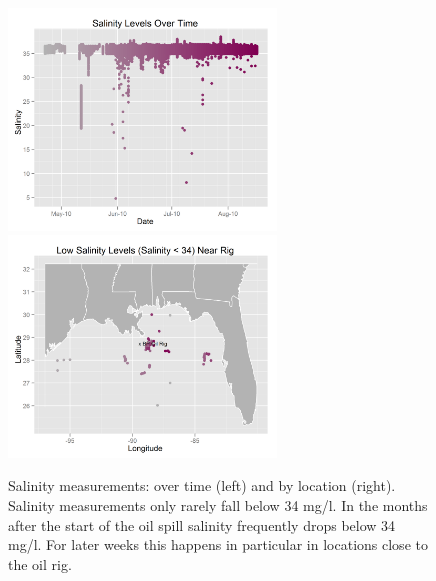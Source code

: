 \documentclass[authoryear,12pt]{elsarticle}
\begin{document}
\begin{figure}[htbp] %
   \centering
   \includegraphics[width=2.8in]{salinity-time.png} 
   \includegraphics[width=2.8in]{salinity-map.png} 
   \caption{Salinity measurements: over time (left) and by location (right).  Salinity measurements only rarely fall below 34 mg/l. In the months after the start of the oil spill salinity frequently drops below 34 mg/l. For later weeks this happens in particular in locations close to the oil rig.}
   \label{salinity-timeline}
\end{figure}
\end{document}
